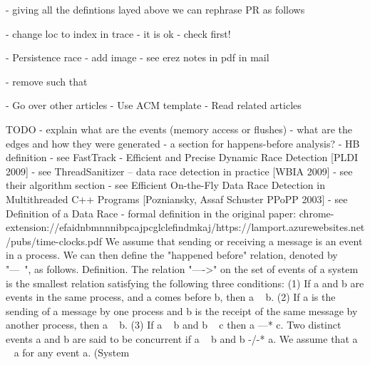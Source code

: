 \documentclass[a4paper,12pt]{article}
\begin{document}
- giving all the defintions layed above we can rephrase PR as follows

- change loc to index in trace - it is ok - check first!

- Persistence race
    - add image
    - see erez notes in pdf in mail

- remove such that


- Go over other articles
- Use ACM template
- Read related articles












TODO
- explain what are the events (memory access or flushes)
- what are the edges and how they were generated
    - a section for happens-before analysis?
- HB definition
    - see FastTrack - Efficient and Precise Dynamic Race Detection [PLDI 2009]
    - see ThreadSanitizer – data race detection in practice [WBIA 2009]
        - see their algorithm section
    - see Efficient On-the-Fly Data Race Detection in Multithreaded C++ Programs [Pozniansky, Assaf Schuster PPoPP 2003]
        - see Definition of a Data Race
    - formal definition in the original paper: chrome-extension://efaidnbmnnnibpcajpcglclefindmkaj/https://lamport.azurewebsites.net/pubs/time-clocks.pdf
        We assume that sending or receiving a message is an event in a process. We can then define the "happened before" relation, denoted by "---~", as follows. Definition. The relation "---->" on the set of events of a system is the smallest relation satisfying the following three conditions: (1) If a and b are events in the same process, and a comes before b, then a ~ b. (2) If a is the sending of a message by one process and b is the receipt of the same message by another process, then a ~ b. (3) If a ~ b and b ~ c then a ---* c. Two distinct events a and b are said to be concurrent if a ~ b and b -/-* a. We assume that a ~ a for any event a. (System

        
\fi




\newcommand{\FontSet}[1]{\ensuremath{\mathsf{#1}}}
\end{document}
